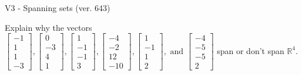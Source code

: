 \begin{exercise}
  \begin{exerciseTitle}V3 - Spanning sets (ver. 643)\end{exerciseTitle}
  \begin{exerciseStatement}
    Explain why the vectors \(\left[\begin{array}{r}
-1 \\
1 \\
1 \\
-3
\end{array}\right] , \left[\begin{array}{r}
0 \\
-3 \\
4 \\
1
\end{array}\right] , \left[\begin{array}{r}
1 \\
-1 \\
-1 \\
3
\end{array}\right] , \left[\begin{array}{r}
-4 \\
-2 \\
12 \\
-10
\end{array}\right] , \left[\begin{array}{r}
1 \\
-1 \\
1 \\
2
\end{array}\right] , \text{ and } \left[\begin{array}{r}
-4 \\
-5 \\
-5 \\
2
\end{array}\right]\) span or don't span \(\mathbb{R}^4\). 
	



\end{exerciseStatement}
\end{exercise}
